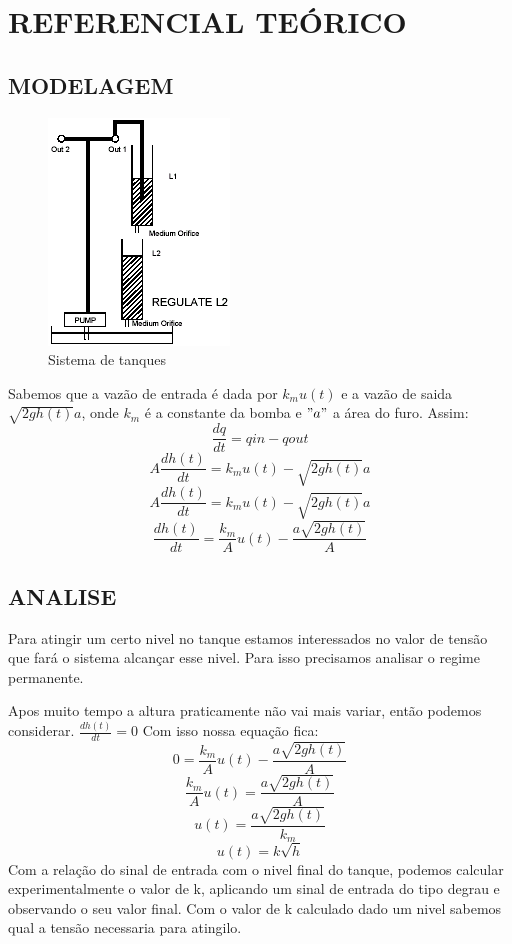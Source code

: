\documentclass[a4paper,12pt]{article}
\begin{document}
\newpage


\thispagestyle{main}

\section{REFERENCIAL TEÓRICO}

\subsection{MODELAGEM}

\begin{figure}[h]
\includegraphics[scale=1]{tanques.png}
\caption{Sistema de tanques}
\label{fig:tanques}
\end{figure}
Sabemos que a vazão de entrada é dada por $ k_mu(t) $ e a vazão de saida $ \sqrt{2gh(t)}a $, onde $k_m$ é a constante da bomba e $"a"$ a área do furo. Assim: 
\[ \frac{dq}{dt}=qin-qout\]
\[ A\frac{dh(t)}{dt}=k_mu(t)-\sqrt{2gh(t)}a \]
\[ A\frac{dh(t)}{dt}=k_mu(t)-\sqrt{2gh(t)}a \]
\[ \frac{dh(t)}{dt}= \frac{k_m}{A}u(t)- \frac{a\sqrt{2gh(t)}}{A} \]

\subsection{ANALISE}

Para atingir um certo nivel no tanque estamos interessados no valor de tensão que fará o sistema alcançar esse nivel. Para isso precisamos analisar o regime permanente.

Apos muito tempo a altura praticamente não vai mais variar, então podemos considerar.  $\frac{dh(t)}{dt}=0 $
Com isso nossa equação fica:
\[ 0= \frac{k_m}{A}u(t)- \frac{a\sqrt{2gh(t)}}{A} \]
\[ \frac{k_m}{A}u(t)= \frac{a\sqrt{2gh(t)}}{A} \]
\[ u(t)=  \frac{a\sqrt{2gh(t)}}{k_m}\]
\begin{equation}\label{eq:1}
u(t)=k\sqrt{h}
\end{equation}
Com a relação do sinal de entrada com o nivel final do tanque, podemos calcular experimentalmente o valor de k, aplicando um sinal de entrada do tipo degrau e observando o seu valor final.
Com o valor de k calculado dado um nivel sabemos qual a tensão necessaria para atingilo.
\end{document}
